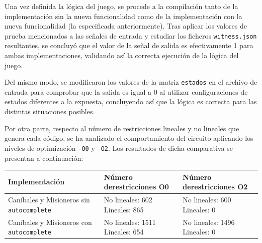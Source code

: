 \documentclass[a4paper,12pt]{report}
\begin{document}
	\vspace{0.2cm}
	\noindent Una vez definida la lógica del juego, se procede a la compilación tanto de la implementación sin la nueva funcionalidad como de la implementación con la nueva funcionalidad (la especificada anteriormente). Tras aplicar los valores de prueba mencionados a las señales de entrada y estudiar los ficheros \texttt{witness.json} resultantes, se concluyó que el valor de la señal de salida es efectivamente 1 para ambas implementaciones, validando así la correcta ejecución de la lógica del juego.
	
	\vspace{0.2cm}
	\noindent Del mismo modo, se modificaron los valores de la matriz \texttt{estados} en el archivo de entrada para comprobar que la salida es igual a 0 al utilizar configuraciones de estados diferentes a la expuesta, concluyendo así que la lógica es correcta para las distintas situaciones posibles.
	
	\vspace{0.2cm}
	\noindent Por otra parte, respecto al número de restricciones lineales y no lineales que genera cada código, se ha analizado el comportamiento del circuito aplicando los niveles de optimización \texttt{-O0} y \texttt{-O2}. Los resultados de dicha comparativa se presentan a continuación:
	
	\vspace{0.2cm}
	\begingroup 
	\renewcommand{\arraystretch}{1.8} 
	\begin{longtable}{|>{\centering\arraybackslash}m{4.5cm}|>{\centering\arraybackslash}m{4.8cm}|>{\centering\arraybackslash}m{4.8cm}|}
		\hline
		\textbf{Implementación} & \textbf{Número de\newline restricciones O0} & \textbf{Número de\newline restricciones O2} \\
		\hline
		
		Caníbales y Misioneros sin \texttt{autocomplete} & No lineales: 602 \newline Lineales: 865 & No lineales: 600 \newline Lineales: 0 \\
		\hline
		
		Caníbales y Misioneros con \texttt{autocomplete} & No lineales: 1511 \newline Lineales: 654 & No lineales: 1496 \newline Lineales: 0 \\
		\hline
	\end{longtable}
	\endgroup
	
\end{document}
